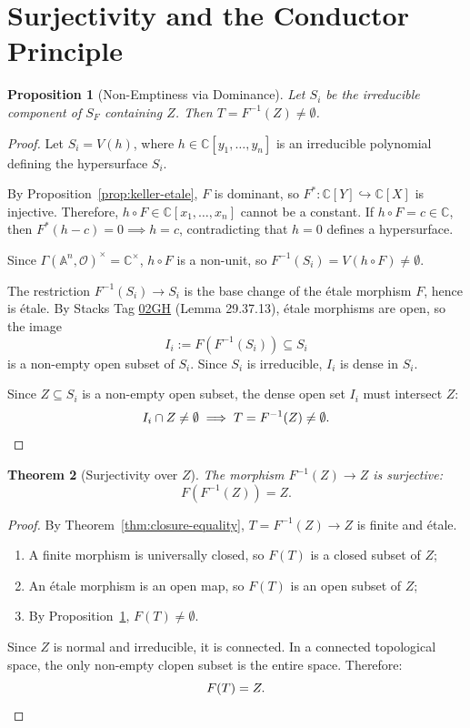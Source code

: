 \documentclass[11pt,reqno]{amsart}
\theoremstyle{plain}
\newtheorem{theorem}{Theorem}[section]
\newtheorem{proposition}[theorem]{Proposition}
\theoremstyle{definition}
\numberwithin{equation}{section}
\newcommand{\A}{\mathbb{A}}
\newcommand{\C}{\mathbb{C}}
\newcommand{\cO}{\mathcal{O}}
\begin{document}
\section{Surjectivity and the Conductor Principle}

\begin{proposition}[Non-Emptiness via Dominance]\label{prop:nonempty}
Let $S_i$ be the irreducible component of $S_F$ containing $Z$. Then $T = F^{-1}(Z) \neq \emptyset$.
\end{proposition}
\begin{proof}
Let $S_i = V(h)$, where $h \in \C[y_1, \dots, y_n]$ is an irreducible polynomial defining the hypersurface $S_i$. 

By Proposition~\ref{prop:keller-etale}, $F$ is dominant, so $F^*: \C[Y] \hookrightarrow \C[X]$ is injective. Therefore, $h \circ F \in \C[x_1, \dots, x_n]$ cannot be a constant. If $h \circ F = c \in \C$, then $F^*(h-c) = 0 \implies h = c$, contradicting that $h=0$ defines a hypersurface. 

Since $\Gamma(\A^n, \cO)^\times = \C^\times$, $h \circ F$ is a non-unit, so $F^{-1}(S_i) = V(h \circ F) \neq \emptyset$.

The restriction $F^{-1}(S_i) \to S_i$ is the base change of the \'{e}tale morphism $F$, hence is \'{e}tale. By Stacks Tag \href{https://stacks.math.columbia.edu/tag/02GH}{02GH} (Lemma 29.37.13), \'{e}tale morphisms are open, so the image
\[
I_i := F(F^{-1}(S_i)) \subseteq S_i
\]
is a non-empty open subset of $S_i$. Since $S_i$ is irreducible, $I_i$ is dense in $S_i$.

Since $Z \subseteq S_i$ is a non-empty open subset, the dense open set $I_i$ must intersect $Z$:
\[
I_i \cap Z \neq \emptyset \implies T = F^{-1}(Z) \neq \emptyset. \qedhere
\]
\end{proof}

\begin{theorem}[Surjectivity over $Z$]\label{thm:local-surjectivity}
The morphism $F^{-1}(Z) \to Z$ is surjective:
\[
F(F^{-1}(Z)) = Z.
\]
\end{theorem}
\begin{proof}
By Theorem~\ref{thm:closure-equality}, $T = F^{-1}(Z) \to Z$ is finite and \'{e}tale.
\begin{enumerate}[(1)]
\item A finite morphism is universally closed, so $F(T)$ is a closed subset of $Z$;
\item An \'{e}tale morphism is an open map, so $F(T)$ is an open subset of $Z$;
\item By Proposition~\ref{prop:nonempty}, $F(T) \neq \emptyset$.
\end{enumerate}
Since $Z$ is normal and irreducible, it is connected. In a connected topological space, the only non-empty clopen subset is the entire space. Therefore:
\[
F(T) = Z. \qedhere
\]
\end{proof}
\end{document}
